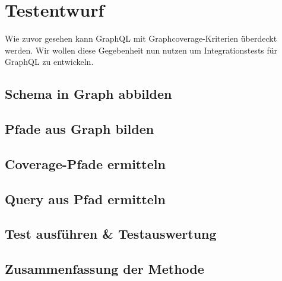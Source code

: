 \chapter{Testentwurf}

Wie zuvor gesehen kann GraphQL mit Graphcoverage-Kriterien überdeckt werden.
Wir wollen diese Gegebenheit nun nutzen um Integrationstests für GraphQL zu entwickeln.


\section{ Schema in Graph abbilden }

\section{ Pfade aus Graph bilden }

\section{ Coverage-Pfade ermitteln }

\section{ Query aus Pfad ermitteln }

\section{ Test ausführen \& Testauswertung }

\section{ Zusammenfassung der Methode }
